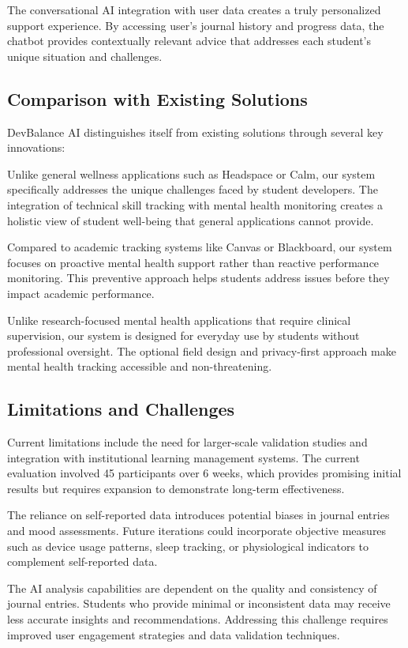 \documentclass[conference,10pt]{IEEEtran}
\begin{document}
The conversational AI integration with user data creates a truly personalized support experience. By accessing user's journal history and progress data, the chatbot provides contextually relevant advice that addresses each student's unique situation and challenges.

\subsection{Comparison with Existing Solutions}

DevBalance AI distinguishes itself from existing solutions through several key innovations:

Unlike general wellness applications such as Headspace or Calm, our system specifically addresses the unique challenges faced by student developers. The integration of technical skill tracking with mental health monitoring creates a holistic view of student well-being that general applications cannot provide.

Compared to academic tracking systems like Canvas or Blackboard, our system focuses on proactive mental health support rather than reactive performance monitoring. This preventive approach helps students address issues before they impact academic performance.

Unlike research-focused mental health applications that require clinical supervision, our system is designed for everyday use by students without professional oversight. The optional field design and privacy-first approach make mental health tracking accessible and non-threatening.

\subsection{Limitations and Challenges}

Current limitations include the need for larger-scale validation studies and integration with institutional learning management systems. The current evaluation involved 45 participants over 6 weeks, which provides promising initial results but requires expansion to demonstrate long-term effectiveness.

The reliance on self-reported data introduces potential biases in journal entries and mood assessments. Future iterations could incorporate objective measures such as device usage patterns, sleep tracking, or physiological indicators to complement self-reported data.

The AI analysis capabilities are dependent on the quality and consistency of journal entries. Students who provide minimal or inconsistent data may receive less accurate insights and recommendations. Addressing this challenge requires improved user engagement strategies and data validation techniques.
\end{document}
